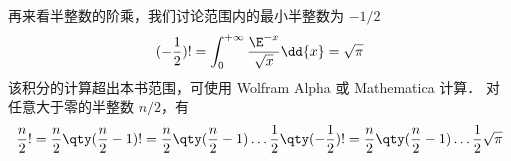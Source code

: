 再来看半整数的阶乘，我们讨论范围内的最小半整数为 $-1/2$ 
\begin{equation}
(-\frac12) ! = \int_0^{+\infty} \frac{\E^{-x}}{\sqrt x}\dd{x} = \sqrt{\pi}
\end{equation}
该积分的计算超出本书范围，可使用 Wolfram Alpha 或 Mathematica 计算．%
对任意大于零的半整数 $n/2$，有
\begin{equation}
\frac{n}{2}! = \frac{n}{2} \qty(\frac{n}{2}-1)! = \frac{n}{2} \qty(\frac{n}{2}-1) \dots \frac12 \qty(-\frac12) ! = \frac{n}{2} \qty(\frac{n}{2}-1) \dots \frac12 \sqrt{\pi}
\end{equation}














